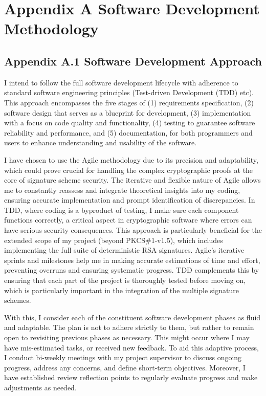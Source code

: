 \documentclass[]{final_report}
\theoremstyle{definition}
\begin{document}
\tableofcontents{}\newpage



\chapter{Appendix A Software Development Methodology}
\section{Appendix A.1 Software Development Approach}
I intend to follow the full software development lifecycle with adherence to standard software engineering principles (Test-driven Development (TDD) etc). This approach encompasses the five stages of (1) requirements specification, (2) software design that serves as a blueprint for development, (3) implementation with a focus on code quality and functionality, (4) testing to guarantee software reliability and performance, and (5) documentation, for both programmers and users to enhance understanding and usability of the software.

I have chosen to use the Agile methodology due to its precision and adaptability, which could prove crucial for handling the complex cryptographic proofs at the core of signature scheme security. The iterative and flexible nature of Agile allows me to constantly reassess and integrate theoretical insights into my coding, ensuring accurate implementation and prompt identification of discrepancies. In TDD, where coding is a byproduct of testing, I make sure each component functions correctly, a critical aspect in cryptographic software where errors can have serious security consequences. This approach is particularly beneficial for the extended scope of my project (beyond PKCS\#1-v1.5), which includes implementing the full suite of deterministic RSA signatures. Agile's iterative sprints and milestones help me in making accurate estimations of time and effort, preventing overruns and ensuring systematic progress. TDD complements this by ensuring that each part of the project is thoroughly tested before moving on, which is particularly important in the integration of the multiple signature schemes. 

With this, I consider each of the constituent software development phases as fluid and adaptable. The plan is not to adhere strictly to them, but rather to remain open to revisiting previous phases as necessary. This might occur where I may have mis-estimated tasks, or received new feedback. To aid this adaptive process, I conduct bi-weekly meetings with my project supervisor to discuss ongoing progress, address any concerns, and define short-term objectives. Moreover, I have established review reflection points to regularly evaluate progress and make adjustments as needed.
\end{document}
